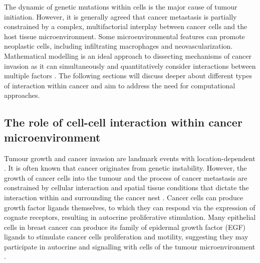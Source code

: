 The dynamic of genetic mutations within cells is the major cause of tumour initiation. However, it is generally agreed that cancer metastasis is partially constrained by a complex, multifactorial interplay between cancer cells and the host tissue microenvironment. Some microenvironmental features can promote neoplastic cells, including infiltrating macrophages and neovascularization. Mathematical modelling is an ideal approach to dissecting mechanisms of cancer invasion as it can simultaneously and quantitatively consider interactions between multiple factors \cite{anderson2006tumor}. The following sections will discuss deeper about different types of interaction within cancer and aim to address the need for computational approaches.       

\subsection{The role of cell-cell interaction within cancer microenvironment}
Tumour growth and cancer invasion are landmark events with location-dependent \cite{friedl2011cancer}. It is often known that cancer originates from genetic instability. However, the growth of cancer cells into the tumour and the process of cancer metastasis are constrained by cellular interaction and spatial tissue conditions that dictate the interaction within and surrounding the cancer nest \cite{west2019cellular, liotta2001microenvironment,anderson2006tumor}. Cancer cells can produce growth factor ligands themselves, to which they can respond via the expression of cognate receptors, resulting in autocrine proliferative stimulation. Many epithelial cells in breast cancer can produce its family of epidermal growth factor (EGF) ligands to stimulate cancer cells proliferation and motility, suggesting they may participate in autocrine and signalling with cells of the tumour microenvironment \cite{nickerson2013autocrine}.  

